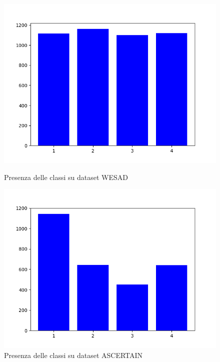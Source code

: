 \begin{figure}[h]
    \begin{minipage}[b]{0.5\textwidth}
		\includegraphics[width=\textwidth]{img/graphs/wesad_dataset.png}
		\caption{Presenza delle classi su dataset WESAD}
		\label{fig:wesadclasses}
	\end{minipage}
    \hfill
    \begin{minipage}[b]{0.5\textwidth}
		\includegraphics[width=\textwidth]{img/graphs/ascertain_dataset.png}
		\caption{Presenza delle classi su dataset ASCERTAIN}
		\label{fig:ascertainclasses}
	\end{minipage}
\end{figure}

